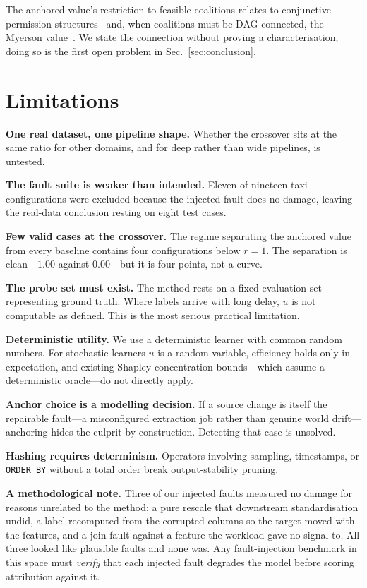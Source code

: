\documentclass[conference]{IEEEtran}
\begin{document}
The anchored value's restriction to feasible coalitions relates to conjunctive
permission structures~\cite{permission} and, when coalitions must be
DAG-connected, the Myerson value~\cite{myerson}. We state the connection without
proving a characterisation; doing so is the first open problem in
Sec.~\ref{sec:conclusion}.

\section{Limitations}\label{sec:limits}

\textbf{One real dataset, one pipeline shape.} Whether the crossover sits at the
same ratio for other domains, and for deep rather than wide pipelines, is
untested.

\textbf{The fault suite is weaker than intended.} Eleven of nineteen taxi
configurations were excluded because the injected fault does no damage, leaving
the real-data conclusion resting on eight test cases.

\textbf{Few valid cases at the crossover.} The regime separating the anchored
value from every baseline contains four configurations below $r=1$. The
separation is clean---$1.00$ against $0.00$---but it is four points, not a curve.

\textbf{The probe set must exist.} The method rests on a fixed evaluation set
representing ground truth. Where labels arrive with long delay, $u$ is not
computable as defined. This is the most serious practical limitation.

\textbf{Deterministic utility.} We use a deterministic learner with common random
numbers. For stochastic learners $u$ is a random variable, efficiency holds only
in expectation, and existing Shapley concentration bounds---which assume a
deterministic oracle---do not directly apply.

\textbf{Anchor choice is a modelling decision.} If a source change is itself the
repairable fault---a misconfigured extraction job rather than genuine world
drift---anchoring hides the culprit by construction. Detecting that case is
unsolved.

\textbf{Hashing requires determinism.} Operators involving sampling, timestamps,
or \texttt{ORDER BY} without a total order break output-stability pruning.

\textbf{A methodological note.} Three of our injected faults measured no damage
for reasons unrelated to the method: a pure rescale that downstream
standardisation undid, a label recomputed from the corrupted columns so the
target moved with the features, and a join fault against a feature the workload
gave no signal to. All three looked like plausible faults and none was. Any
fault-injection benchmark in this space must \emph{verify} that each injected
fault degrades the model before scoring attribution against it.
\end{document}
